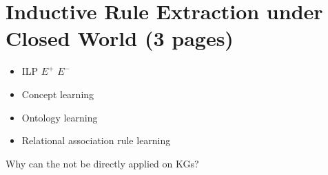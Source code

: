 \section{Inductive Rule Extraction under Closed World (3 pages)}
\label{sec:rule_learning_cwa}

\begin{itemize}
\item ILP $E^+$ $E^-$
\item Concept learning
\item Ontology learning
\item Relational  association rule learning
\end{itemize}



Why can the not be directly applied on KGs?

